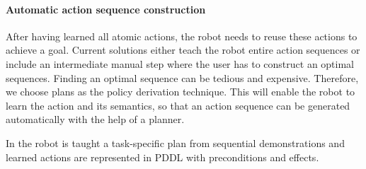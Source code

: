 \paragraph{Automatic action sequence construction}
After having learned all atomic actions, the robot needs to reuse these actions to achieve a goal.
Current solutions either teach the robot entire action sequences or include an intermediate manual step where the user has to construct an optimal sequences.
Finding an optimal sequence can be tedious and expensive.
Therefore, we choose plans as the policy derivation technique.
This will enable the robot to learn the action and its semantics, so that an action sequence can be generated automatically with the help of a planner. 


In \cite{veeraraghavan2008teaching} the robot is taught a task-specific plan from sequential demonstrations and  learned actions are represented in PDDL with preconditions and effects.